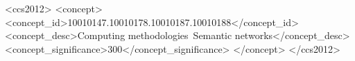 \documentclass[sigconf]{acmart}
\begin{document}

\begin{CCSXML}
<ccs2012>
   <concept>
       <concept_id>10010147.10010178.10010187.10010188</concept_id>
       <concept_desc>Computing methodologies~Semantic networks</concept_desc>
       <concept_significance>300</concept_significance>
       </concept>
 </ccs2012>
\end{CCSXML}



\end{document}
